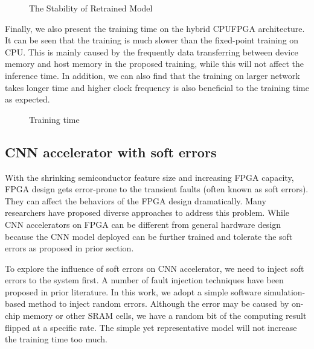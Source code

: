 \begin{figure}
        \caption{The Stability of Retrained Model}
        \label{fig:stability}
\end{figure}

  Finally, we also present the training time on the hybrid CPUFPGA architecture. 
It can be seen that the training is much slower than the fixed-point training on CPU. 
This is mainly caused by the frequently data transferring between device memory and host 
memory in the proposed training, while this will not affect the inference time. In addition, 
we can also find that the training on larger network takes longer time and higher clock frequency 
is also beneficial to the training time as expected. 

\begin{figure}
        \caption{Training time}
        \label{fig:time}
\end{figure}

\subsection{CNN accelerator with soft errors}
  With the shrinking semiconductor feature size and increasing FPGA capacity, 
FPGA design gets error-prone to the transient faults (often known as soft errors). 
They can affect the behaviors of the FPGA design dramatically. Many researchers \cite{Mansour_20,Karim_21,Nidhin_22,Subasi_23,ROSCH_24} 
have proposed diverse approaches to address this problem. While CNN accelerators on FPGA can be different 
from general hardware design because the CNN model deployed can be further trained and tolerate the 
soft errors as proposed in prior section\cite{Tu2018RANA_1}.

  To explore the influence of soft errors on CNN accelerator, we need to inject soft errors to the system first. 
A number of fault injection techniques have been proposed in prior literature. In this work, we adopt 
a simple software simulation- based method to inject random errors. Although the error may be caused by 
on-chip memory or other SRAM cells, we have a random bit of the computing result flipped at a specific rate. 
The simple yet representative model will not increase the training time too much.

